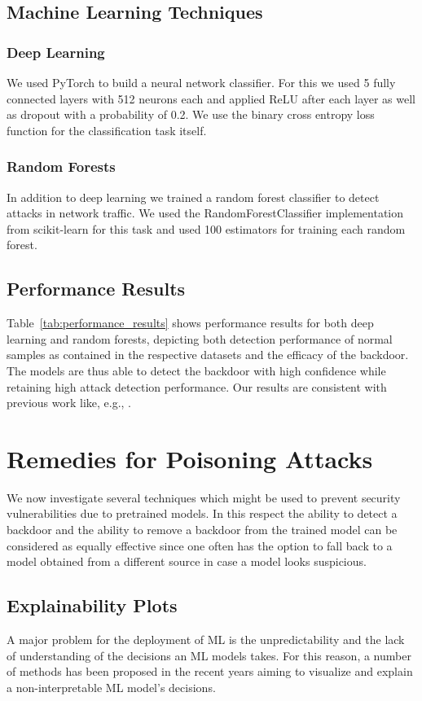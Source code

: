 \documentclass[10pt,sigconf,letterpaper,dvipsnames]{acmart}
\begin{document}
\subsection{Machine Learning Techniques}
\subsubsection{Deep Learning}
We used PyTorch to build a neural network classifier. For this we used 5 fully connected layers with 512 neurons each and applied ReLU after each layer as well as dropout with a probability of 0.2. We use the binary cross entropy loss function for the classification task itself.

\subsubsection{Random Forests}
In addition to deep learning we trained a random forest classifier to detect attacks in network traffic. We used the RandomForestClassifier implementation from scikit-learn for this task and used 100 estimators for training each random forest.


\subsection{Performance Results}
Table~\ref{tab:performance_results} shows performance results for both deep learning and random forests, depicting both detection performance of normal samples as contained in the respective datasets and the efficacy of the backdoor. The models are thus able to detect the backdoor with high confidence while retaining high attack detection performance.
Our results are consistent with previous work like, e.g., \cite{meghdouri_analysis_2018}.

\section{Remedies for Poisoning Attacks}
We now investigate several techniques which might be used to prevent security vulnerabilities due to pretrained models. In this respect the ability to detect a backdoor and the ability to remove a backdoor from the trained model can be considered as equally effective since one often has the option to fall back to a model obtained from a different source in case a model looks suspicious.

\subsection{Explainability Plots} \label{sec:plots}
A major problem for the deployment of ML is the unpredictability and the lack of understanding of the decisions an ML models takes. For this reason, a number of methods has been proposed in the recent years aiming to visualize and explain a non-interpretable ML model's decisions.
\end{document}
